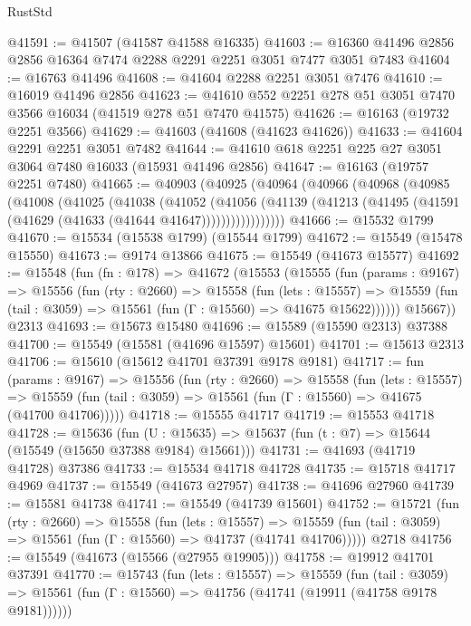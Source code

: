 \begin{lexlean}{RustStd}
\begin{coremodule}
@41591 := @41507 (@41587 @41588 @16335)
@41603 := @16360 @41496 @2856 @2856 @16364 @7474 @2288 @2291 @2251 @3051 @7477 @3051 @7483
@41604 := @16763 @41496
@41608 := @41604 @2288 @2251 @3051 @7476
@41610 := @16019 @41496 @2856
@41623 := @41610 @552 @2251 @278 @51 @3051 @7470 @3566 @16034 (@41519 @278 @51 @7470 @41575)
@41626 := @16163 (@19732 @2251 @3566)
@41629 := @41603 (@41608 (@41623 @41626))
@41633 := @41604 @2291 @2251 @3051 @7482
@41644 := @41610 @618 @2251 @225 @27 @3051 @3064 @7480 @16033 (@15931 @41496 @2856)
@41647 := @16163 (@19757 @2251 @7480)
@41665 := @40903
    (@40925
      (@40964
        (@40966
          (@40968
            (@40985
              (@41008
                (@41025
                  (@41038
                    (@41052
                      (@41056
                        (@41139
                          (@41213 (@41495 (@41591 (@41629 (@41633 (@41644 @41647)))))))))))))))))
@41666 := @15532 @1799
@41670 := @15534 (@15538 @1799) (@15544 @1799)
@41672 := @15549 (@15478 @15550)
@41673 := @9174 @13866
@41675 := @15549 (@41673 @15577)
@41692 := @15548
    (fun (fn : @178) =>
    @41672
      (@15553
        (@15555
          (fun (params : @9167) =>
          @15556
            (fun (rty : @2660) =>
            @15558
              (fun (lets : @15557) =>
              @15559 (fun (tail : @3059) => @15561 (fun (Γ : @15560) => @41675 @15622))))))
        @15667))
    @2313
@41693 := @15673 @15480
@41696 := @15589 (@15590 @2313) @37388
@41700 := @15549 (@15581 (@41696 @15597) @15601)
@41701 := @15613 @2313
@41706 := @15610 (@15612 @41701 @37391 @9178 @9181)
@41717 := fun (params : @9167) =>
  @15556
    (fun (rty : @2660) =>
    @15558
      (fun (lets : @15557) =>
      @15559 (fun (tail : @3059) => @15561 (fun (Γ : @15560) => @41675 (@41700 @41706)))))
@41718 := @15555 @41717
@41719 := @15553 @41718
@41728 := @15636
    (fun (U : @15635) => @15637 (fun (t : @7) => @15644 (@15549 (@15650 @37388 @9184) @15661)))
@41731 := @41693 (@41719 @41728) @37386
@41733 := @15534 @41718 @41728
@41735 := @15718 @41717 @4969
@41737 := @15549 (@41673 @27957)
@41738 := @41696 @27960
@41739 := @15581 @41738
@41741 := @15549 (@41739 @15601)
@41752 := @15721
    (fun (rty : @2660) =>
    @15558
      (fun (lets : @15557) =>
      @15559 (fun (tail : @3059) => @15561 (fun (Γ : @15560) => @41737 (@41741 @41706)))))
    @2718
@41756 := @15549 (@41673 (@15566 (@27955 @19905)))
@41758 := @19912 @41701 @37391
@41770 := @15743
    (fun (lets : @15557) =>
    @15559
      (fun (tail : @3059) =>
      @15561 (fun (Γ : @15560) => @41756 (@41741 (@19911 (@41758 @9178 @9181))))))

\end{coremodule}
\end{lexlean}
